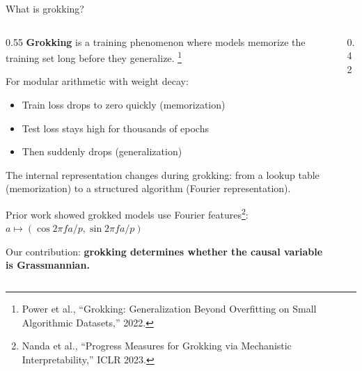 \documentclass[aspectratio=169,11pt]{beamer}
\begin{document}
\begin{frame}{What is grokking?}

\begin{columns}[T]
\begin{column}{0.55\textwidth}
{\small \textbf{Grokking} is a training phenomenon where models memorize the training set long before they generalize.}%
\footnote{\tiny Power et al., ``Grokking: Generalization Beyond Overfitting on Small Algorithmic Datasets,'' 2022.}

\vspace{0.3em}
{\small For modular arithmetic with weight decay:}
\begin{itemize}
  \item {\small Train loss drops to zero quickly (memorization)}
  \item {\small Test loss stays high for thousands of epochs}
  \item {\small Then suddenly drops (generalization)}
\end{itemize}

\vspace{0.3em}
{\small The internal representation changes during grokking: from a lookup table (memorization) to a structured algorithm (Fourier representation).}

\vspace{0.3em}
{\small Prior work showed grokked models use Fourier features\footnote{\tiny Nanda et al., ``Progress Measures for Grokking via Mechanistic Interpretability,'' ICLR 2023.}:\\$a \mapsto (\cos 2\pi f a / p, \sin 2\pi f a / p)$}

\vspace{0.3em}
{\small Our contribution: \textbf{grokking determines whether the causal variable is Grassmannian.}}
\end{column}
\begin{column}{0.42\textwidth}
\end{column}
\end{columns}
\end{frame}
\end{document}
